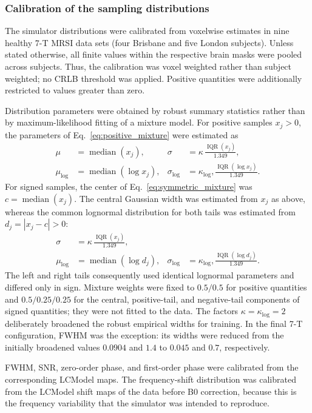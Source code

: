 \subsubsection{Calibration of the sampling distributions}

The simulator distributions were calibrated from voxelwise estimates in nine
healthy 7-T MRSI data sets (four Brisbane and five London subjects).  Unless
stated otherwise, all finite values within the respective brain masks were
pooled across subjects.  Thus, the calibration was voxel weighted rather than
subject weighted; no CRLB threshold was applied.  Positive quantities were
additionally restricted to values greater than zero.

Distribution parameters were obtained by robust summary statistics rather
than by maximum-likelihood fitting of a mixture model.  For positive samples
$x_j>0$, the parameters of Eq.~\eqref{eq:positive_mixture} were estimated as
\begin{align}
    \mu &= \operatorname{median}(x_j), &
    \sigma &= \kappa\,\frac{\operatorname{IQR}(x_j)}{1.349},\\
    \mu_{\log} &= \operatorname{median}(\log x_j), &
    \sigma_{\log} &= \kappa_{\log},
        \frac{\operatorname{IQR}(\log x_j)}{1.349}.
\end{align}
For signed samples, the center of Eq.~\eqref{eq:symmetric_mixture} was
$c=\operatorname{median}(x_j)$.  The central Gaussian width was estimated from
$x_j$ as above, whereas the common lognormal distribution for both tails was
estimated from $d_j=|x_j-c|>0$:
\begin{align}
    \sigma &= \kappa\,\frac{\operatorname{IQR}(x_j)}{1.349},\\
    \mu_{\log} &= \operatorname{median}(\log d_j), &
    \sigma_{\log} &= \kappa_{\log},
        \frac{\operatorname{IQR}(\log d_j)}{1.349}.
\end{align}
The left and right tails consequently used identical lognormal parameters and
differed only in sign.  Mixture weights were fixed to $0.5/0.5$ for positive
quantities and $0.5/0.25/0.25$ for the central, positive-tail, and
negative-tail components of signed quantities; they were not fitted to the
data.  The factors $\kappa=\kappa_{\log}=2$ deliberately broadened the robust
empirical widths for training.  In the final 7-T configuration, FWHM was the
exception: its widths were reduced from the initially broadened values
$0.0904$ and $1.4$ to $0.045$ and $0.7$, respectively.

FWHM, SNR, zero-order phase, and first-order phase were calibrated from the
corresponding LCModel maps.  The frequency-shift distribution was calibrated
from the LCModel shift maps of the data before B0 correction, because this is
the frequency variability that the simulator was intended to reproduce.

